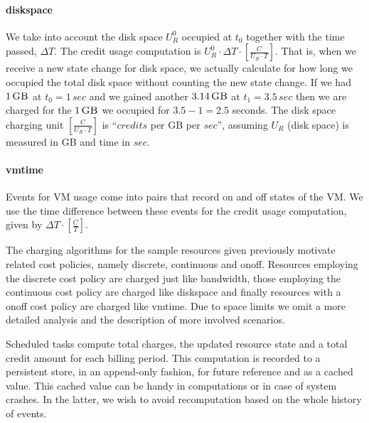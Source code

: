 \documentclass[letterpaper,twocolumn,10pt]{article}
\newcommand{\GB}[1]{\ensuremath{#1\,\mbox{\sc GB}}}
\newcommand{\secs}[1]{\ensuremath{#1\,sec}}
\begin{document}
\paragraph{\textsf{diskspace}}
We take into account the disk space $U_R^0$ occupied at $t_0$ together with the time passed, $\Delta T$. The credit usage computation is $U_R^{0} \cdot \Delta T \cdot [ \frac{C}{U_R \cdot T} ]$.
That is, when we receive a new state change for disk space, we actually calculate for how long we occupied the total disk space without counting the new state change. If we had \GB{1} at $t_0 = \secs{1}$ and we gained another \GB{3.14} at $t_1 = \secs{3.5}$ then we are charged for the \GB{1} we occupied for $3.5 - 1 = 2.5$ seconds. The disk space charging unit $[ \frac{C}{U_R \cdot T} ]$ is ``$credits$ per {\sc GB} per $sec$'', assuming $U_R$ (disk space) is measured in {\sc GB} and time in $sec$.


\paragraph{\textsf{vmtime}}
Events for VM usage come into pairs that record \textsf{on} and \textsf{off} states of the VM. We use the time difference between these events for the credit usage computation, given by $\Delta T \cdot [ \frac{C}{T} ]$.


The charging algorithms for the sample resources given previously motivate related cost policies, namely \textsf{discrete}, \textsf{continuous} and \textsf{onoff}. Resources employing the \textsf{discrete} cost policy are charged just like \textsf{bandwidth}, those employing the \textsf{continuous} cost policy are charged like \textsf{diskspace} and finally resources with a \textsf{onoff} cost policy are charged like \textsf{vmtime}. Due to space limits we omit a more detailed analysis and the description of more involved scenarios.




Scheduled tasks compute total charges, the updated resource state and
a total credit amount for each billing period. This computation is
recorded to a persistent store, in an append-only fashion, for future
reference and as a cached value. This cached value can be handy in
computations or in case of system crashes. In the latter, we wish to
avoid recomputation based on the whole history of events.
\end{document}
